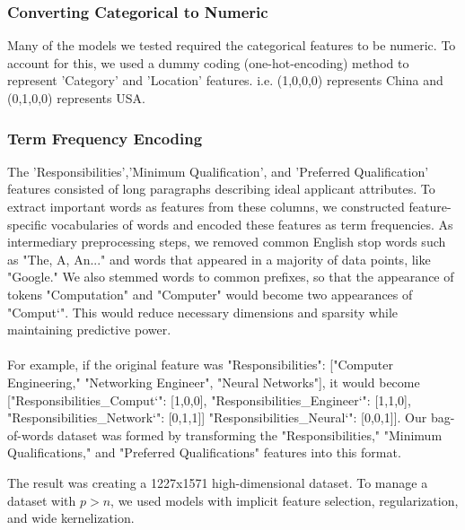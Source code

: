 \documentclass[9.5 pt]{article}
\begin{document}
\subsubsection{Converting Categorical to Numeric}
Many of the models we tested required the categorical features to be numeric. To account for this, we used a dummy coding (one-hot-encoding) method to represent 'Category' and 'Location' features. i.e. (1,0,0,0) represents China and (0,1,0,0) represents USA. 

\subsubsection{Term Frequency Encoding}
The 'Responsibilities','Minimum Qualification', and 'Preferred Qualification' features consisted of long paragraphs describing ideal applicant attributes. To extract important words as features from these columns, we constructed feature-specific vocabularies of words and encoded these features as term frequencies. As intermediary preprocessing steps, we removed common English stop words such as "The, A, An..." and words that appeared in a majority of data points, like "Google." We also stemmed words to common prefixes, so that the appearance of tokens "Computation" and "Computer" would become two appearances of "Comput`". This would reduce necessary dimensions and sparsity while maintaining predictive power. \\ \\
For example, if the original feature was "Responsibilities": ["Computer Engineering," "Networking Engineer", "Neural Networks"], it would become ["Responsibilities\_Comput`": [1,0,0], "Responsibilities\_Engineer`": [1,1,0],
"Responsibilities\_Network`": [0,1,1]]
"Responsibilities\_Neural`": [0,0,1]]. Our bag-of-words dataset was formed by transforming the "Responsibilities," "Minimum Qualifications," and "Preferred Qualifications" features into this format.

The result was creating a 1227x1571 high-dimensional dataset. To manage a dataset with $p > n$, we used models with implicit feature selection, regularization, and wide kernelization.
\end{document}
